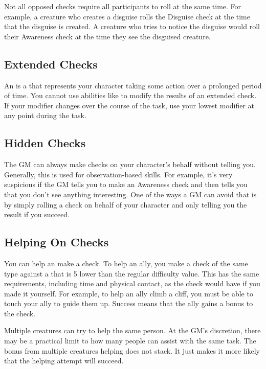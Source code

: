     Not all opposed checks require all participants to roll at the same time.
    For example, a creature who creates a disguise rolls the Disguise check at the time that the disguise is created.
    A creature who tries to notice the disguise would roll their Awareness check at the time they see the disguised creature.

  \subsection{Extended Checks}\label{Extended Checks}
    An  is a  that represents your character taking some action over a prolonged period of time.
    You cannot use abilities like  to modify the results of an extended check.
    If your modifier changes over the course of the task, use your lowest modifier at any point during the task.

  \subsection{Hidden Checks}
    The GM can always make checks on your character's behalf without telling you.
    Generally, this is used for observation-based skills.
    For example, it's very suspicious if the GM tells you to make an Awareness check and then tells you that you don't see anything interesting.
    One of the ways a GM can avoid that is by simply rolling a check on behalf of your character and only telling you the result if you succeed.

  \subsection{Helping On Checks}
    You can help an  make a check.
    To help an ally, you make a check of the same type against a  that is 5 lower than the regular difficulty value.
    This has the same requirements, including time and physical contact, as the check would have if you made it yourself.
    For example, to help an ally climb a cliff, you must be able to touch your ally to guide them up.
    Success means that the ally gains a  bonus to the check.

    Multiple creatures can try to help the same person.
    At the GM's discretion, there may be a practical limit to how many people can assist with the same task.
    The bonus from multiple creatures helping does not stack.
    It just makes it more likely that the helping attempt will succeed.

